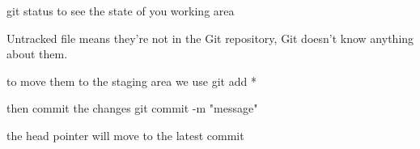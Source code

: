 git status   
  to see the state of you working area 

Untracked file 
  means they're not in the Git repository, Git doesn't know anything about them.

to move them to the staging area we use git add * 

then commit the changes 
  git commit -m "message"

the head pointer will move to the latest commit 